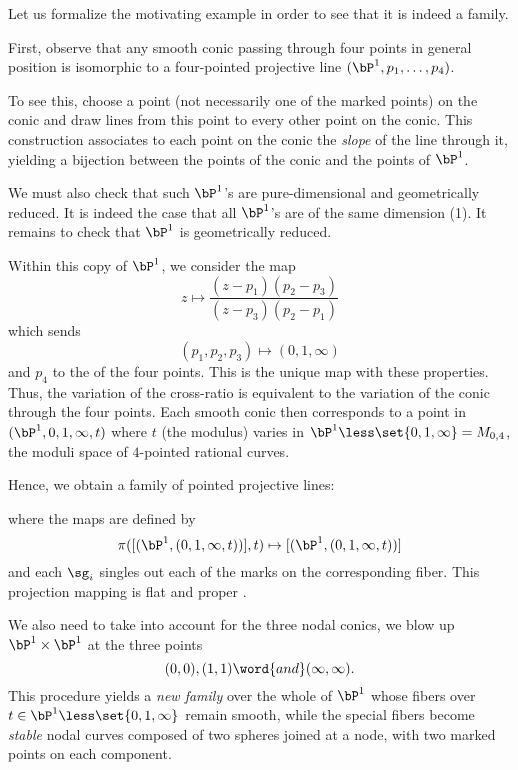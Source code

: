 \begin{Ex}
    Let us formalize the motivating example in order to see that it is indeed a family.\par
First, observe that any smooth conic passing through four points in general position is isomorphic to a four-pointed projective line $(\bP^1, p_1, \dotsc, p_4)$. 
\begin{ptcb}
    To see this, choose a point (not necessarily one of the marked points) on the conic and draw lines from this point to every other point on the conic. This construction associates to each point on the conic the \emph{slope} of the line through it, yielding a bijection between the points of the conic and the points of $\bP^1$.
\end{ptcb}
We must also check that such $\bP^1$'s are pure-dimensional and geometrically reduced. It is indeed the case that all $\bP^1$'s are of the same dimension (1). It remains to check that $\bP^1$ is geometrically reduced.\par
Within this copy of $\bP^1$, we consider the map
    $$z\mapsto\frac{(z-p_1)(p_2-p_3)}{(z-p_3)(p_2-p_1)}$$
    which sends
    $$(p_1,p_2,p_3)\mapsto(0,1,\infty)$$ 
    and $p_4$ to the  of the four points. This is the unique map with these properties. Thus, the variation of the cross-ratio is equivalent to the variation of the conic through the four points. Each smooth conic then corresponds to a point in $(\bP^1, 0, 1, \infty, t)$ where $t$ (the modulus) varies in $\bP^1 \less \set{0,1,\infty} = M_{0,4}$, the moduli space of $4$-pointed rational curves.\par
    Hence, we obtain a family of pointed projective lines:
    \begin{center}
    \end{center}
    where the maps are defined by
    $$\pi([(\bP^1,(0,1,\infty,t))],t)\mapsto [(\bP^1,(0,1,\infty,t))]$$
    and each $\sg_i$ singles out each of the marks on the corresponding fiber. This projection mapping is flat and proper .\par
    We also need to take into account for the three nodal conics, we blow up $\bP^1 \times \bP^1$ at the three points
    $$(0,0),(1,1)\word{and}(\infty,\infty).$$
    This procedure yields a \emph{new family} over the whole of $\bP^1$ whose fibers over $t \in \bP^1 \less \set{0,1,\infty}$ remain smooth, while the special fibers become \emph{stable} nodal curves composed of two spheres joined at a node, with two marked points on each component.
\end{Ex}

